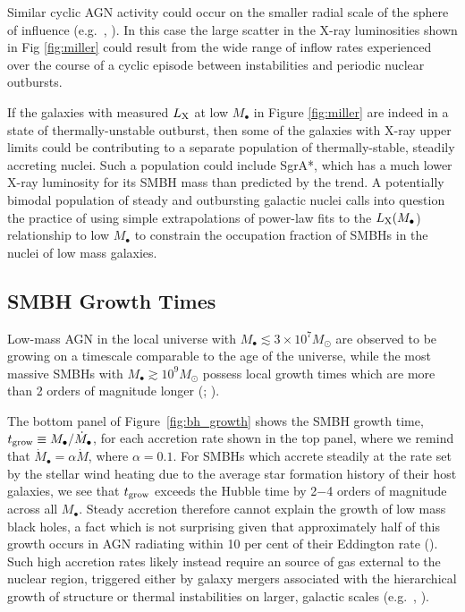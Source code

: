 \documentclass[usenatbib,fleqn]{mn2e}
\begin{document}
Similar cyclic AGN activity could occur on the smaller radial scale of
the sphere of influence (e.g.~\citealt{Yuan&Li11},
\citealt{Cuadra+15}).  In this case the large scatter in the X-ray
luminosities shown in Fig \ref{fig:miller} could result from the wide
range of inflow rates experienced over the course of a cyclic episode
between instabilities and periodic nuclear outbursts. 

If the galaxies with measured $L_{\rm X}$ at low $M_{\bullet}$ in
Figure \ref{fig:miller} are indeed in a state of thermally-unstable
outburst, then some of the galaxies with X-ray upper limits could be
contributing to a separate population of thermally-stable, steadily
accreting nuclei.  Such a population could include SgrA*, which has a
much lower X-ray luminosity for its SMBH mass than predicted by the
\citet{Miller+15} trend.  A potentially bimodal population of steady
and outbursting galactic nuclei calls into question the practice of
using simple extrapolations of power-law fits to the $L_{\rm
  X}(M_{\bullet}$) relationship to low $M_{\bullet}$ to constrain the
occupation fraction of SMBHs in the nuclei of low mass galaxies.



\subsection{SMBH Growth Times }
\label{sec:growth}

Low-mass AGN in the local universe with $M_{\bullet} \lesssim 3\times
10^{7}M_{\odot}$ are observed to be growing on a timescale comparable
to the age of the universe, while the most massive SMBHs with
$M_{\bullet} \gtrsim 10^{9}M_{\odot}$ possess local growth times which
are more than 2 orders of magnitude longer (\citealt{Heckman+04};
\citealt{Kauffmann&Heckman09}).

The bottom panel of Figure~\ref{fig:bh_growth} shows the SMBH growth
time, $t_{\rm grow} \equiv M_{\bullet}/\dot{M}_{\bullet}$, for each accretion
rate shown in the top panel, where we remind that $\dot{M}_{\bullet} = \alpha\dot{M}$, where $\alpha = 0.1$.  For SMBHs which accrete steadily at the
rate set by the stellar wind heating due to the average star formation
history of their host galaxies, we see that $t_{\rm grow}$ exceeds the
Hubble time by 2$-$4 orders of magnitude across all $M_{\bullet}$.
Steady accretion therefore cannot explain the growth of low mass black
holes, a fact which is not surprising given that approximately half of
this growth occurs in AGN radiating within 10 per cent of their
Eddington rate (\citealt{Heckman+04}).  Such high accretion rates
likely instead require an source of gas external to the nuclear
region, triggered either by galaxy mergers associated with the
hierarchical growth of structure or thermal instabilities on larger,
galactic scales (e.g.~\citealt{Ciotti+10}, \citealt{Voit+15}).  
\end{document}
